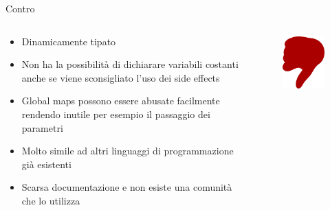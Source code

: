 \begin{frame}{Contro}

	\begin{columns}

		\begin{column}{1\textwidth}

			\begin{itemize}
				\item Dinamicamente tipato
				\item Non ha la possibilità di dichiarare variabili costanti anche se viene sconsigliato l'uso dei side effects
				\item Global maps possono essere abusate facilmente rendendo inutile per esempio il passaggio dei parametri
				\item Molto simile ad altri linguaggi di programmazione già esistenti
				\item Scarsa documentazione e non esiste una comunità che lo utilizza
			\end{itemize}

		\end{column}

		\begin{column}{0.1\textwidth}
			\begin{figure}
				\vspace*{-5cm}
				\hspace*{-1.5cm}
				\includegraphics[scale=0.3]{res/contro}
			\end{figure}
		\end{column}

	\end{columns}

\end{frame}